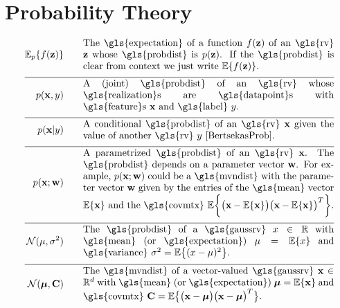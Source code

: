\section*{Probability Theory} 
\begin{align}
	\expect_{p} \{ f(\datapoint) \}  \quad\quad & \parbox{.75\textwidth}{The \gls{expectation} of a function $f(\datapoint)$ of an \gls{rv} 
		$\datapoint$ whose \gls{probdist} is $\prob{\datapoint}$. If the \gls{probdist} is clear from context 
		we just write $\expect \{ f(\datapoint) \}$. }  \nonumber \\[2mm] \hline \nonumber\\[-5mm]    
	\prob{\featurevec,\truelabel} \quad\quad & \parbox{.75\textwidth}{A (joint) \gls{probdist} of an \gls{rv} 
		whose \gls{realization}s are \gls{datapoint}s with \gls{feature}s $\featurevec$ and \gls{label} $\truelabel$.} \nonumber        \nonumber \\[2mm] \hline \nonumber\\[-5mm]        
	\prob{\featurevec|\truelabel} \quad\quad & \parbox{.75\textwidth}{A conditional \gls{probdist} of an \gls{rv} 
		$\featurevec$ given the value of another \gls{rv} $\truelabel$ \cite[Sec.\ 3.5]{BertsekasProb}. } \nonumber       \nonumber \\[2mm] \hline \nonumber\\[-5mm]           
	\prob{\featurevec;\weights} \quad\quad & \parbox{.75\textwidth}{A parametrized \gls{probdist} of an \gls{rv} $\featurevec$. 
		The \gls{probdist} depends on a parameter vector $\weights$. For example, $\prob{\featurevec;\weights}$ could be a 
		\gls{mvndist} with the parameter vector $\weights$ given by the entries of the \gls{mean} vector $\expect \{ \featurevec \}$ 
		and the \gls{covmtx} $\expect \bigg \{ \big( \featurevec - \expect \{ \featurevec \}\big) \big( \featurevec - \expect \{ \featurevec \}\big)^{T}  \bigg\}$.} \nonumber           \nonumber \\[2mm] \hline \nonumber\\[-5mm]
	\mathcal{N}(\mu, \sigma^{2}) \quad\quad & \parbox{.75\textwidth}{The \gls{probdist} of a 
		\gls{gaussrv} $\feature \in \mathbb{R}$ with \gls{mean} (or \gls{expectation}) $\mu= \expect \{ \feature \}$ 
		and \gls{variance} $\sigma^{2} =   \expect \big\{  (  \feature - \mu )^2 \big\}$.} \nonumber    \nonumber \\[2mm] \hline \nonumber\\[-5mm]
	\mathcal{N}(\clustermean, \mathbf{C}) \quad\quad & \parbox{.75\textwidth}{The \gls{mvndist} of a vector-valued 
		\gls{gaussrv} $\featurevec \in \mathbb{R}^{\featuredim}$ with \gls{mean} (or \gls{expectation}) $\clustermean= \expect \{ \featurevec \}$ 
		and \gls{covmtx} $\mathbf{C} =  \expect \big\{ \big( \featurevec - \clustermean \big)\big( \featurevec - \clustermean \big)^{T} \big\}$.} \nonumber                                             
\end{align}





